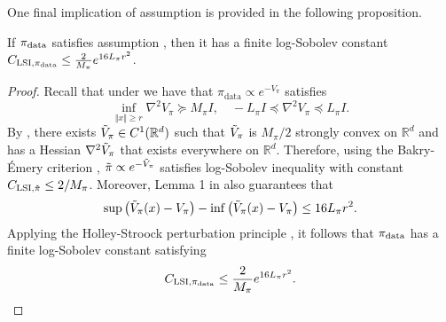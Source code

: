 One final implication of assumption  is provided in the following proposition.
\begin{proposition}\label{lemma:assumption_implies_LSI}
    If  $\operatorname*{\pi_{\text{data}}}$ satisfies assumption , then it has a finite log-Sobolev constant $C_{\text{LSI}, \operatorname*{\pi_{\text{data}}}}\leq \frac{2}{M_\pi} e^{16 L_\pi r^2}$.
\end{proposition}
\begin{proof}
Recall that under  we have that $\pi_{\text{data}} \propto e^{-V_\pi}$ satisfies
     \begin{equation*}
         \inf_{\Vert x\Vert \geq r} \nabla^2 V_\pi \succcurlyeq M_{\pi} I, \quad -L_{\pi} I\preccurlyeq \nabla^2 V_\pi \preccurlyeq L_{\pi} I.
     \end{equation*}
By \citet[Lemma 1]{doi:10.1073/pnas.1820003116}, there exists $\Tilde{V}_\pi\in C^1(\mathbb{R}^d)$ such that $\Tilde{V}_\pi$ is $M_\pi/2$ strongly convex on $\mathbb{R}^d$ and has a Hessian $\nabla^2 \Tilde{V}_\pi$ that exists everywhere on $\mathbb{R}^d$. Therefore, using the Bakry-Émery criterion \citep{bakry_emery}, $\Tilde{\pi}\propto e^{-\Tilde{V}_\pi}$ satisfies log-Sobolev inequality with constant $C_{\text{LSI}, \Tilde{\pi}}\leq 2/M_\pi$. 
Moreover, Lemma 1 in \citet{doi:10.1073/pnas.1820003116} also guarantees that
\begin{equation*}
    \sup \left(\Tilde{V}_\pi(x) - V_\pi\right) - \inf\left(\Tilde{V}_\pi(x) - V_\pi\right) \leq 16 L_\pi r^2.
\end{equation*}
Applying  the Holley-Stroock perturbation principle \citep{RefWorks:RefID:85-holley1987logarithmic}, it follows that $\operatorname*{\pi_{\text{data}}}$ has a finite log-Sobolev constant satisfying 
\begin{equation*}
    C_{\text{LSI}, \operatorname*{\pi_{\text{data}}}}\leq\frac{2}{ M_{\pi}}e^{16 L_\pi r^2}.
\end{equation*}

\end{proof}

